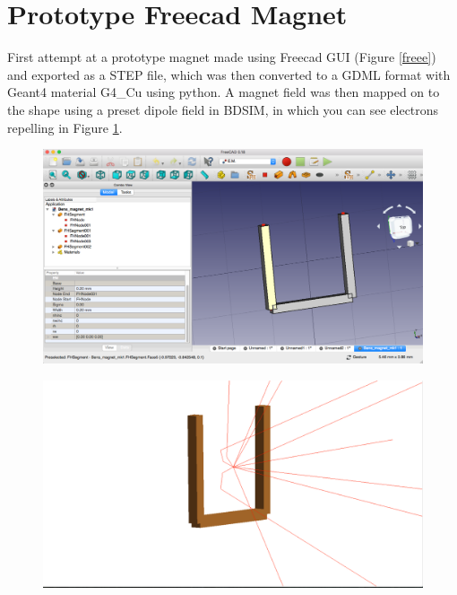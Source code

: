 \documentclass[12pt,a4paper]{article}
\begin{document}
\small


\section{Prototype Freecad Magnet}
\label{mag}
First attempt at a prototype magnet made using Freecad GUI (Figure \ref{freee}) and exported as a STEP file, which was then converted to a GDML format with Geant4 material G4\_Cu using python. A magnet field was then mapped on to the shape using a preset dipole field in BDSIM, in which you can see electrons repelling in Figure \ref{repel}.

\begin{figure}[h!]
\centering
\begin{minipage}{.5\textwidth}
  \centering
  \includegraphics[height=0.5\linewidth]{Images//CAD_Mag//maginfreecad.png}
  \label{freee}
\end{minipage}%
\begin{minipage}{.5\textwidth}
  \centering
  \includegraphics[height=.5\linewidth]{Images//CAD_Mag//maginbdsim.png}
  \label{repel}
\end{minipage}%
\end{figure}
\end{document}
